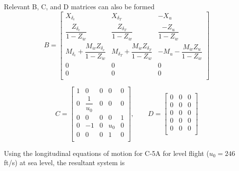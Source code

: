 \documentclass[11pt]{article}
\begin{document}
\noindent Relevant B, C, and D matrices can also be formed
\begin{equation*}
B =
\begin{bmatrix}
    X_{\delta_e}                                                   & X_{\delta_T}                                                   & -X_u                                          \\
    \dfrac{Z_{\delta_e}}{1-Z_{\dot{w}}}                            & \dfrac{Z_{\delta_T}}{1-Z_{\dot{w}}}                            & \dfrac{-Z_u}{1-Z_{\dot{w}}}                   \\
    M_{\delta_e} + \dfrac{M_{\dot{w}} Z_{\delta_e}}{1-Z_{\dot{w}}} & M_{\delta_T} + \dfrac{M_{\dot{w}} Z_{\delta_T}}{1-Z_{\dot{w}}} & -M_u - \dfrac{M_{\dot{w}} Z_u}{1-Z_{\dot{w}}} \\
    0   &  0   &  0 \\
    0   &  0   &  0 \\
\end{bmatrix}
\end{equation*}

\begin{equation*}
C =
\begin{bmatrix}
    1 &          0     & 0 & 0   & 0\\
    0 & \dfrac{1}{u_0} & 0 & 0   & 0\\
    0 &          0     & 0 & 0   & 1\\
    0 &         -1     & 0 & u_0 & 0\\
    0 &          0     & 0 & 1   & 0\\
\end{bmatrix},
\qquad
D =
\begin{bmatrix}
    0 & 0 & 0 \\
    0 & 0 & 0 \\
    0 & 0 & 0 \\
    0 & 0 & 0 \\
    0 & 0 & 0 \\
\end{bmatrix}
\end{equation*}

\clearpage
\noindent Using the longitudinal equations of motion for C-5A for level flight ($u_0=246$ ft/s) at sea level, the resultant system is
\end{document}

